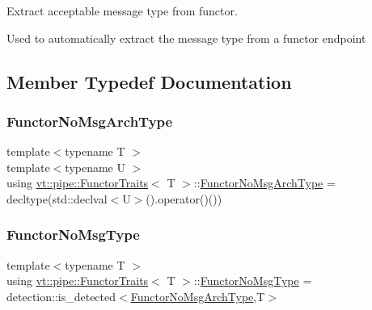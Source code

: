 Extract acceptable message type from functor. 

Used to automatically extract the message type from a functor endpoint 

\subsection{Member Typedef Documentation}
\mbox{\label{structvt_1_1pipe_1_1_functor_traits_af2002cb6723439f6b1e74c7a70255cc8}} 
\subsubsection{\texorpdfstring{Functor\+No\+Msg\+Arch\+Type}{FunctorNoMsgArchType}}
{\footnotesize\ttfamily template$<$typename T $>$ \\
template$<$typename U $>$ \\
using \hyperlink{structvt_1_1pipe_1_1_functor_traits}{vt\+::pipe\+::\+Functor\+Traits}$<$ T $>$\+::\hyperlink{structvt_1_1pipe_1_1_functor_traits_af2002cb6723439f6b1e74c7a70255cc8}{Functor\+No\+Msg\+Arch\+Type} =  decltype(std\+::declval$<$U$>$().operator()())}

\mbox{\label{structvt_1_1pipe_1_1_functor_traits_a2b729de8c328206718e4eea1d9b30f9b}} 
\subsubsection{\texorpdfstring{Functor\+No\+Msg\+Type}{FunctorNoMsgType}}
{\footnotesize\ttfamily template$<$typename T $>$ \\
using \hyperlink{structvt_1_1pipe_1_1_functor_traits}{vt\+::pipe\+::\+Functor\+Traits}$<$ T $>$\+::\hyperlink{structvt_1_1pipe_1_1_functor_traits_a2b729de8c328206718e4eea1d9b30f9b}{Functor\+No\+Msg\+Type} =  detection\+::is\+\_\+detected$<$\hyperlink{structvt_1_1pipe_1_1_functor_traits_af2002cb6723439f6b1e74c7a70255cc8}{Functor\+No\+Msg\+Arch\+Type},T$>$}




